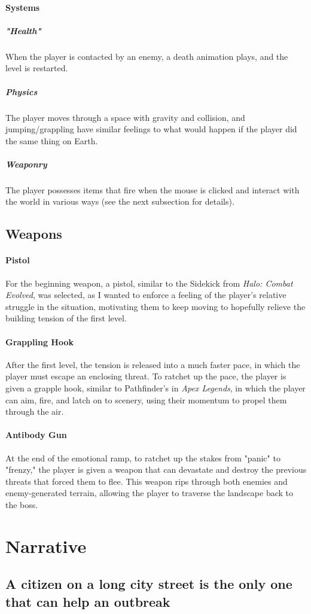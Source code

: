 \documentclass[letterpaper]{report}
\begin{document}
				\paragraph{Systems}
					\subparagraph{"Health"}
						When the player is contacted by an enemy, a death animation plays, and the level is restarted.
					\subparagraph{Physics}
						The player moves through a space with gravity and collision, and jumping/grappling have similar feelings to what would happen if the player did the same thing on Earth.
					\subparagraph{Weaponry}
						The player possesses items that fire when the mouse is clicked and interact with the world in various ways (see the next subsection for details).
			\subsection{Weapons}
				\paragraph{Pistol}
					For the beginning weapon, a pistol, similar to the Sidekick from \emph{Halo: Combat Evolved}, was selected, as I wanted to enforce a feeling of the player's relative struggle in the situation, motivating them to keep moving to hopefully relieve the building tension of the first level.
				\paragraph{Grappling Hook}
					After the first level, the tension is released into a much faster pace, in which the player must escape an enclosing threat. To ratchet up the pace, the player is given a grapple hook, similar to Pathfinder's in \emph{Apex Legends}, in which the player can aim, fire, and latch on to scenery, using their momentum to propel them through the air.
				\paragraph{Antibody Gun}
					At the end of the emotional ramp, to ratchet up the stakes from "panic" to "frenzy," the player is given a weapon that can devastate and destroy the previous threats that forced them to flee. This weapon rips through both enemies and enemy-generated terrain, allowing the player to traverse the landscape back to the boss.
		\section{Narrative}
			\subsection{A citizen on a long city street is the only one that can help an outbreak}
\end{document}
